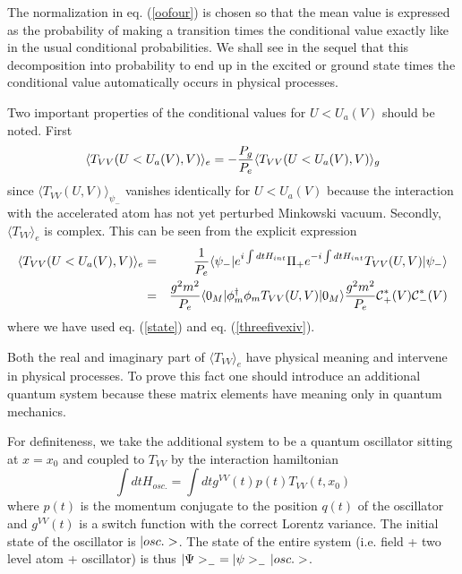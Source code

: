 The normalization in eq. (\ref{oofour}) is chosen so
that the mean value is expressed as the probability of
making a transition times the conditional value exactly like in the usual
conditional probabilities.
We shall see in the sequel that
this decomposition into probability to end up in the excited or ground state
 times the conditional value  automatically occurs in physical
processes.

Two
important properties of the conditional values for $U<U_a(V)$ should be
noted. First
\begin{equation}
 \langle
T_{VV}(U<U_a(V),V)\rangle_e = - { P_g \over P_e} \langle
T_{VV}(U<U_a(V),V)\rangle_g
\label{-}
\end{equation}
since $\langle  T_{VV}(U,V)\rangle_{\psi_-}$
vanishes identically
for $U<U_a(V)$ because
the interaction with the accelerated atom
has not yet perturbed Minkowski vacuum.
Secondly,  $\langle  T_{VV}\rangle_e$ is complex.
This
can be seen from the explicit expression
\begin{eqnarray}
\langle  T_{VV}(U<U_a(V),V)\rangle_e &=& {1 \over P_e}
\langle \psi_-\vert e^{i\int dt H_{int}} \Pi_+  e^{-i\int
dt H_{int}} T_{VV}(U,V)\vert\psi_-\rangle\nonumber\\ &=&
{g^2 m^2 \over P_e} \langle 0_M\vert \phi_m^\dagger \phi_m
T_{VV}(U,V)\vert 0_M\rangle
{g^2 m^2 \over P_e} \mbox{$\cal C $}_+^*(V) \mbox{$\cal C $}_-^*(V)
\label{oofive} \end{eqnarray}
where we have used eq. (\ref{state}) and eq. (\ref{threefivexiv}).

Both the real and imaginary part of $\langle  T_{VV}\rangle_e$ have
physical meaning and intervene in physical processes. To
prove this fact one should introduce an additional quantum
system  because these matrix elements have meaning only
in quantum mechanics.

For definiteness, we take the additional system
to be a quantum oscillator sitting at $x=x_0$ and coupled to
$T_{VV}$ by the interaction hamiltonian
\begin{equation}
\int dt H_{osc.} = \int dt g^{VV}(t) p(t) T_{VV}(t,x_0)
\label{ooten}
\end{equation}
where $p(t)$ is the momentum conjugate to the position $q(t)$ of
the oscillator and $g^{VV}(t)$ is a switch function with
the correct Lorentz variance.
The initial state of the
oscillator is $\mbox{$ \vert osc. > $}$.
The state of the entire system (i.e. field + two level atom + oscillator) is
thus $\mbox{$ \vert \Psi > $}_-=\mbox{$ \vert \psi > $}_-\ \mbox{$ \vert osc. > $}$.

